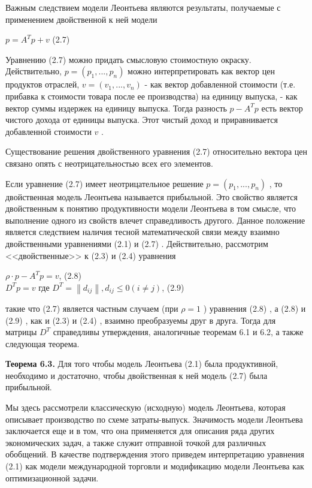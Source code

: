 \documentclass[12pt, 4paper]{book}
\begin{document}
{Важным следствием модели Леонтьева являются результаты, получаемые с применением двойственной к ней модели 
\begin{center}
$p=A^Tp+v$ (2.7)
\end{center}
\par

Уравнению (2.7) можно придать смысловую стоимостную окраску. Действительно, $p=(p_1,...,p_n)$ можно интерпретировать как вектор цен продуктов отраслей, $v=(v_1,...,v_n)$ - как вектор добавленной стоимости (т.е. прибавка к стоимости товара после ее производства) на единицу выпуска,  - как вектор суммы издержек на единицу выпуска. Тогда разность $p-A^Tp$ есть вектор чистого дохода от единицы выпуска. Этот чистый доход и приравнивается добавленной стоимости $v$ . 
\par

Существование решения двойственного уравнения (2.7) относительно вектора цен связано опять с неотрицательностью всех его элементов.
\par

Если уравнение (2.7) имеет неотрицательное решение $p=(p_1,...,p_n)$ , то двойственная модель Леонтьева называется прибыльной. Это свойство является двойственным к понятию продуктивности модели Леонтьева в том смысле, что выполнение одного из свойств влечет справедливость другого. Данное положение является следствием наличия тесной математической связи между взаимно двойственными уравнениями (2.1) и (2.7) . Действительно, рассмотрим <<двойственные>> к (2.3) и (2.4) уравнения
\begin{center}
$\rho \cdot p -A^T p = v$, (2.8)\\ 
$D^Tp=v$ где $D^T=\left\|d_{ij}\right\|, d_{ij} \leq 0 (i \neq j)$,  (2.9)
\end{center}
такие что (2.7) является частным случаем (при $\rho =1$ ) уравнения (2.8) , а (2.8) и (2.9) , как и (2.3) и (2.4) , взаимно преобразуемы друг в друга. Тогда для матрицы $D^T$ справедливы утверждения, аналогичные теоремам 6.1 и 6.2, а также следующая теорема.
\par

\textbf{Теорема 6.3.} Для того чтобы модель Леонтьева (2.1) была продуктивной, необходимо и достаточно, чтобы двойственная к ней модель (2.7) была прибыльной.
\par

Мы здесь рассмотрели классическую (исходную) модель Леонтьева, которая описывает производство по схеме затраты-выпуск. Значимость модели Леонтьева заключается еще и в том, что она применяется для описания ряда других экономических задач, а также служит отправной точкой для различных обобщений. В качестве подтверждения этого приведем интерпретацию уравнения (2.1) как модели международной торговли и модификацию модели Леонтьева как оптимизационной задачи.
\par

}
\end{document}

